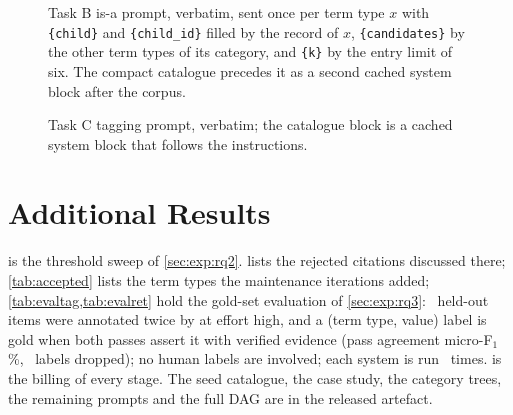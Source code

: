 \begin{figure}[tbp]

\caption{Task B is-a prompt, verbatim, sent once per term type $x$ with
\texttt{\{child\}} and \texttt{\{child\_id\}} filled by the record of $x$,
\texttt{\{candidates\}} by the other term types of its category, and
\texttt{\{k\}} by the entry limit of six. The compact catalogue precedes it
as a second cached system block after the corpus.}
\label{fig:prompttaskb}
\end{figure}

\begin{figure}[tbp]

\caption{Task C tagging prompt, verbatim; the catalogue block is a cached
system block that follows the instructions.}
\label{fig:prompttag}
\end{figure}

\section{Additional Results}
\label{app:results}

 is the threshold sweep of \cref{sec:exp:rq2}.
lists the rejected citations discussed there; \cref{tab:accepted} lists the
term types the maintenance iterations added; \cref{tab:evaltag,tab:evalret}
hold the gold-set evaluation of \cref{sec:exp:rq3}: \GItems\ held-out
items were annotated twice by \texttt{\GModel} at effort high, and a (term
type, value) label is gold when both passes assert it with verified evidence
(pass agreement micro-F$_1$ \GAgreement\%, \GDropped\ labels dropped); no
human labels are involved; each system is run \EvalRunsWord\ times. 
is the billing of every stage. The seed catalogue, the case study,
the category trees, the remaining prompts and the full DAG are in the
released artefact.
